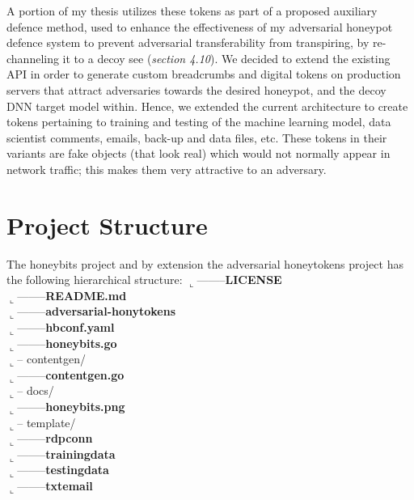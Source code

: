 \documentclass[grad,lot,lof,11pt,oneside,onehalfspace]{RUthesis}
\begin{document}
A portion of my thesis utilizes these tokens as part of a proposed auxiliary defence method, used to enhance the effectiveness of my adversarial honeypot defence system to prevent adversarial transferability from transpiring, by re-channeling it to a decoy see (\textit{section 4.10}). We decided to extend the existing API in order to generate custom breadcrumbs and digital tokens on production servers that attract adversaries towards the desired honeypot, and the decoy DNN target model within. Hence, we extended the current architecture to create tokens pertaining to training and testing of the machine learning model, data scientist comments, emails, back-up and data files, etc. These tokens in their variants are fake objects (that look real) which would not normally appear in network traffic; this makes them very attractive to an adversary. 

\section{Project Structure}
The honeybits project and by extension the adversarial honeytokens project has the following hierarchical structure:\newline
$\llcorner$--------\textbf{LICENSE}\\
$\llcorner$--------\textbf{README.md}\\
$\llcorner$--------\textbf{adversarial-honytokens}\\
$\llcorner$--------\textbf{hbconf.yaml}\\
$\llcorner$--------\textbf{honeybits.go}\\
$\llcorner$-- contentgen/\\
$\llcorner$--------\textbf{contentgen.go}\\
$\llcorner$-- docs/\\
$\llcorner$--------\textbf{honeybits.png}\\
$\llcorner$-- template/\\
$\llcorner$--------\textbf{rdpconn}\\
$\llcorner$--------\textbf{trainingdata}\\
$\llcorner$--------\textbf{testingdata}\\
$\llcorner$--------\textbf{txtemail}\\
\end{document}

